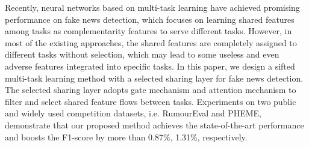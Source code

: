 Recently, neural networks based on multi-task learning have achieved promising performance on fake news detection, which focuses on learning shared features among tasks as complementarity features to serve different tasks. However, in most of the existing approaches, the shared features are completely assigned to different tasks without selection, which may lead to some useless and even adverse features integrated into specific tasks. In this paper, we design a sifted multi-task learning method with a selected sharing layer for fake news detection. The selected sharing layer adopts gate mechanism and attention mechanism to filter and select shared feature flows between tasks. Experiments on two public and widely used competition datasets, i.e. RumourEval and PHEME, demonstrate that our proposed method achieves the state-of-the-art performance and boosts the F1-score by more than 0.87\%, 1.31\%, respectively.